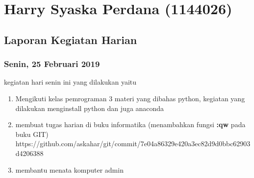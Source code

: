 \chapter{Harry Syaska Perdana (1144026)}
\section{Laporan Kegiatan Harian}
\subsection{Senin, 25 Februari 2019}
kegiatan hari senin ini yang dilakukan yaitu
\begin{enumerate}
\item Mengikuti kelas pemrograman 3 materi yang dibahas python, kegiatan yang dilakukan menginstall python dan juga anaconda
\item membuat tugas harian di buku informatika (menambahkan fungsi \textbf{:qw} pada buku GIT)   
\subitem https://github.com/askahar/git/commit/7e04a86329e420a3ec82d9d0bbc62903d4206388
\item membantu menata komputer admin
\end{enumerate}
